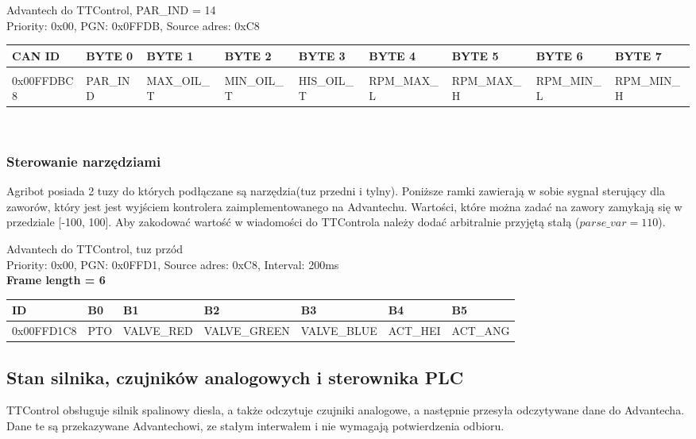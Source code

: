 \documentclass{article}
\begin{document}
Advantech do TTControl, PAR\_IND = 14\\
Priority: 0x00, PGN: 0x0FFDB, Source adres: 0xC8 \\
 \begin{adjustwidth}{-1.6cm}{}
\begin{left}
\begin{tabular}{ |p{2cm}|p{1.35cm}|p{1.8cm}|p{1.7cm}|p{1.65cm}|p{2.05cm}|p{2.05cm}|p{1.9cm}|p{2.0cm}|} 
 \hline
 CAN ID & BYTE 0 & BYTE 1 & BYTE 2 & BYTE 3 & BYTE 4 & BYTE 5 & BYTE 6 & BYTE 7 \\ \hline
 & & & & & & & &\\
0x00FFDBC8 & PAR\_IND & MAX\_OIL\_T & MIN\_OIL\_T & HIS\_OIL\_T & RPM\_MAX\_L & RPM\_MAX\_H & RPM\_MIN\_L & RPM\_MIN\_H \\
 \hline
\end{tabular}
\end{left}\\
 \end{adjustwidth}

\subsubsection{Sterowanie narzędziami}
Agribot posiada 2 tuzy do których podłączane są narzędzia(tuz przedni i tylny). Poniższe ramki zawierają w sobie sygnał sterujący dla zaworów, który jest jest wyjściem kontrolera zaimplementowanego na Advantechu. Wartości, które można zadać na zawory zamykają się w przedziale [-100, 100]. Aby zakodować wartość w wiadomości do TTControla należy dodać arbitralnie przyjętą stałą ($parse\_var = 110$).

Advantech do TTControl, tuz przód\\
Priority: 0x00, PGN: 0x0FFD1, Source adres: 0xC8, Interval: 200ms\\
\textbf{Frame length = 6}
\begin{center}
\begin{tabular}{| p{65pt} | p{25pt} | p{70pt} | p{70pt} | p{75pt} | p{40pt} | p{40pt} |}
    \hline 
    ID & B0 & B1 & B2 & B3 & B4 & B5 \\ 
    \hline
    0x00FFD1C8 & PTO & VALVE\_RED & VALVE\_GREEN & VALVE\_BLUE & ACT\_HEI & ACT\_ANG \\
    \hline
\end{tabular}
\end{center}

\subsection{Stan silnika, czujników analogowych i sterownika PLC}
TTControl obsługuje silnik spalinowy diesla, a także odczytuje czujniki analogowe, a następnie przesyła odczytywane dane do Advantecha. Dane te są przekazywane Advantechowi, ze stałym interwałem i nie wymagają potwierdzenia odbioru.
\end{document}
